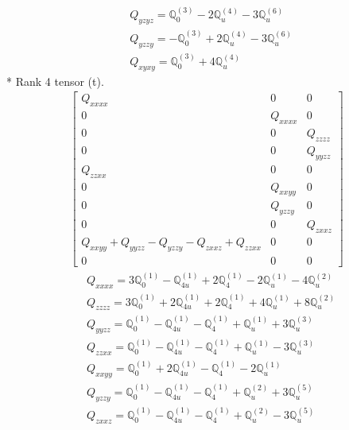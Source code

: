 \documentclass[fleqn,8pt,landscape]{jsarticle}
\begin{document}
\begin{align*}
& Q_{yzyz} = \mathbb{Q}_{0}^{(3)} - 2 \mathbb{Q}_{u}^{(4)} - 3 \mathbb{Q}_{u}^{(6)} \\
& Q_{yzzy} = - \mathbb{Q}_{0}^{(3)} + 2 \mathbb{Q}_{u}^{(4)} - 3 \mathbb{Q}_{u}^{(6)} \\
& Q_{xyxy} = \mathbb{Q}_{0}^{(3)} + 4 \mathbb{Q}_{u}^{(4)}
\end{align*}
* Rank 4 tensor (t).
\begin{align*}
\begin{bmatrix} Q_{xxxx} & 0 & 0 \\ 0 & Q_{xxxx} & 0 \\ 0 & 0 & Q_{zzzz} \\ 0 & 0 & Q_{yyzz} \\ Q_{zzxx} & 0 & 0 \\ 0 & Q_{xxyy} & 0 \\ 0 & Q_{yzzy} & 0 \\ 0 & 0 & Q_{zxxz} \\ Q_{xxyy} + Q_{yyzz} - Q_{yzzy} - Q_{zxxz} + Q_{zzxx} & 0 & 0 \\ 0 & 0 & 0 \end{bmatrix}
\end{align*}
\begin{align*}
& Q_{xxxx} = 3 \mathbb{Q}_{0}^{(1)} - \mathbb{Q}_{4u}^{(1)} + 2 \mathbb{Q}_{4}^{(1)} - 2 \mathbb{Q}_{u}^{(1)} - 4 \mathbb{Q}_{u}^{(2)} \\
& Q_{zzzz} = 3 \mathbb{Q}_{0}^{(1)} + 2 \mathbb{Q}_{4u}^{(1)} + 2 \mathbb{Q}_{4}^{(1)} + 4 \mathbb{Q}_{u}^{(1)} + 8 \mathbb{Q}_{u}^{(2)} \\
& Q_{yyzz} = \mathbb{Q}_{0}^{(1)} - \mathbb{Q}_{4u}^{(1)} - \mathbb{Q}_{4}^{(1)} + \mathbb{Q}_{u}^{(1)} + 3 \mathbb{Q}_{u}^{(3)} \\
& Q_{zzxx} = \mathbb{Q}_{0}^{(1)} - \mathbb{Q}_{4u}^{(1)} - \mathbb{Q}_{4}^{(1)} + \mathbb{Q}_{u}^{(1)} - 3 \mathbb{Q}_{u}^{(3)} \\
& Q_{xxyy} = \mathbb{Q}_{0}^{(1)} + 2 \mathbb{Q}_{4u}^{(1)} - \mathbb{Q}_{4}^{(1)} - 2 \mathbb{Q}_{u}^{(1)} \\
& Q_{yzzy} = \mathbb{Q}_{0}^{(1)} - \mathbb{Q}_{4u}^{(1)} - \mathbb{Q}_{4}^{(1)} + \mathbb{Q}_{u}^{(2)} + 3 \mathbb{Q}_{u}^{(5)} \\
& Q_{zxxz} = \mathbb{Q}_{0}^{(1)} - \mathbb{Q}_{4u}^{(1)} - \mathbb{Q}_{4}^{(1)} + \mathbb{Q}_{u}^{(2)} - 3 \mathbb{Q}_{u}^{(5)}
\end{align*}
\end{document}
